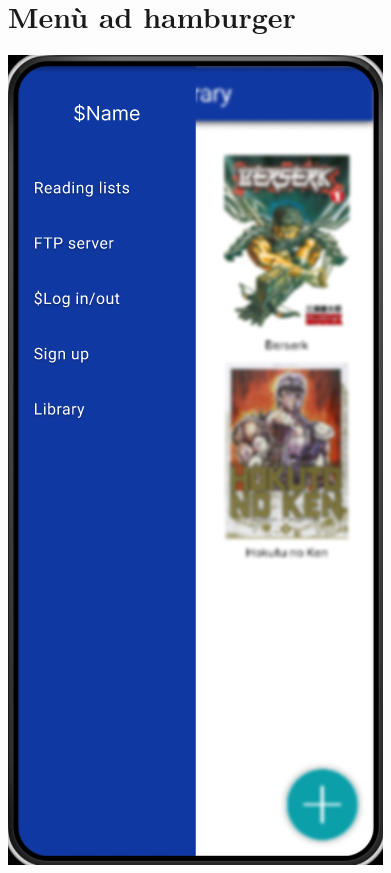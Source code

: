 \documentclass{report}
\begin{document}
\section{Menù ad hamburger}\label{sec:hamburger}

\begin{center}
   \includegraphics[scale=0.4]{hamburger.png}
\end{center}
\end{document}
